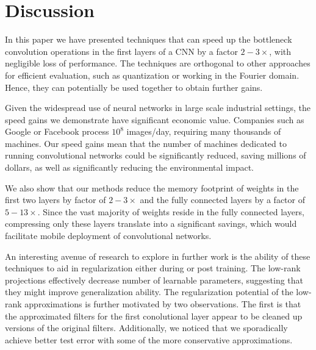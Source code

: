\section{Discussion}
In this paper we have presented techniques that can speed up the
bottleneck convolution operations in the first layers of a CNN by a factor $2-3\times$, with negligible loss of performance.
The techniques are orthogonal
to other approaches for efficient evaluation, such as quantization or
working in the Fourier domain. Hence, they can potentially be used
together to obtain further gains. 

Given the widespread use of neural networks in large scale industrial
settings, the speed gains we demonstrate have significant economic
value. Companies such as Google or Facebook process $10^8$ images/day,
requiring many thousands of machines. Our speed gains mean that the
number of machines dedicated to running convolutional networks could be significantly reduced, saving millions of
dollars, as well as significantly reducing the environmental impact.

We also show that our methods reduce the memory footprint of weights
in the first two layers by factor of $2-3\times$ and the fully connected layers by a factor of $5-13\times$.
Since the vast majority of weights reside in the fully connected layers, compressing only these layers 
translate into a significant savings, which would facilitate mobile deployment
of convolutional networks.  


An interesting avenue of research to explore in further work is the ability of these techniques to aid in regularization either during or post training.
The low-rank projections effectively decrease number of learnable parameters,
suggesting that they might improve generalization ability.
The regularization potential of the low-rank approximations is further motivated by two observations. 
The first is that the approximated filters for the first conolutional layer appear to be cleaned up versions of the original filters. 
Additionally, we noticed that we sporadically achieve better
test error with some of the more conservative approximations. 




